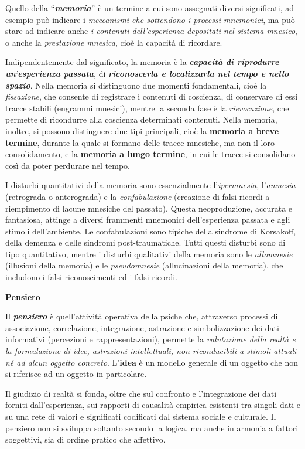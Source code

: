 \documentclass[]{article}
\begin{document}
Quello della ``\textbf{\emph{memoria}}'' è un termine a cui sono
assegnati diversi significati, ad esempio può indicare i
\emph{meccanismi che sottendono i processi mnemonici}, ma può stare ad
indicare anche \emph{i contenuti dell'esperienza depositati nel sistema
mnesico}, o anche la \emph{prestazione mnesica}, cioè la capacità di
ricordare.

Indipendentemente dal significato, la memoria è la
\textbf{\emph{capacità di riprodurre un'esperienza passata}}, di
\textbf{\emph{riconoscerla e localizzarla nel tempo e nello spazio}}.
Nella memoria si distinguono due momenti fondamentali, cioè la
\emph{fissazione}, che consente di registrare i contenuti di coscienza,
di conservare di essi tracce stabili (engrammi mnesici), mentre la
seconda fase è la \emph{rievocazione}, che permette di ricondurre alla
coscienza determinati contenuti. Nella memoria, inoltre, si possono
distinguere due tipi principali, cioè la \textbf{memoria a breve
termine}, durante la quale si formano delle tracce mnesiche, ma non il
loro consolidamento, e la \textbf{memoria a lungo termine}, in cui le
tracce si consolidano così da poter perdurare nel tempo.

I disturbi quantitativi della memoria sono essenzialmente
l'\emph{ipermnesia}, l'\emph{amnesia} (retrograda o anterograda) e la
\emph{confabulazione} (creazione di falsi ricordi a riempimento di
lacune mnesiche del passato). Questa neoproduzione, accurata e
fantasiosa, attinge a diversi frammenti mnemonici dell'esperienza
passata e agli stimoli dell'ambiente. Le confabulazioni sono tipiche
della sindrome di Korsakoff, della demenza e delle sindromi
post-traumatiche. Tutti questi disturbi sono di tipo quantitativo,
mentre i disturbi qualitativi della memoria sono le \emph{allomnesie}
(illusioni della memoria) e le \emph{pseudomnesie} (allucinazioni della
memoria), che includono i falsi riconoscimenti ed i falsi ricordi.

\textbf{Pensiero}

Il \textbf{\emph{pensiero}} è quell'attività operativa della psiche che,
attraverso processi di associazione, correlazione, integrazione,
astrazione e simbolizzazione dei dati informativi (percezioni e
rappresentazioni), permette la \emph{valutazione della realtà e la
formulazione di idee, astrazioni intellettuali, non riconducibili a
stimoli attuali né ad alcun oggetto concreto}. L'\textbf{idea} è un
modello generale di un oggetto che non si riferisce ad un oggetto in
particolare.

Il giudizio di realtà si fonda, oltre che sul confronto e l'integrazione
dei dati forniti dall'esperienza, sui rapporti di causalità empirica
esistenti tra singoli dati e su una rete di valori e significati
codificati dal sistema sociale e culturale. Il pensiero non si sviluppa
soltanto secondo la logica, ma anche in armonia a fattori soggettivi,
sia di ordine pratico che affettivo.
\end{document}
